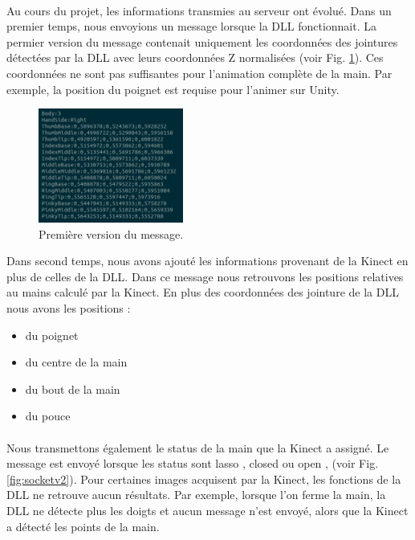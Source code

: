 \paragraph{}
Au cours du projet, les informations transmies au serveur ont évolué. 
Dans un premier temps, nous envoyions un message lorsque la DLL fonctionnait. 
La permier version du message contenait uniquement les coordonnées des 
jointures détectées par la DLL avec leurs coordonnées Z normalisées (voir Fig. \ref{fig:socketv1}).
Ces coordonnées ne sont pas suffisantes pour l'animation complète de la 
main. Par exemple, la position du poignet est requise pour l'animer 
sur Unity.

\begin{figure}[H]
  \label{fig:socketv1}
  \begin{center}
    \includegraphics[width=180px]{images/socket_v1.png}
    \caption{Première version du message.}
  \end{center}
\end{figure}

Dans second temps, nous avons ajouté les informations provenant de la 
Kinect en plus de celles de la DLL. Dans ce message nous retrouvons 
les positions relatives au mains calculé par la Kinect. En plus des 
coordonnées des jointure de la DLL nous avons les positions :\\
\begin{itemize}
  \item du poignet
  \item du centre de la main
  \item du bout de la main
  \item du pouce
\end{itemize}
\paragraph{}
Nous transmettons également le status de la main que la Kinect a 
assigné. Le message est envoyé lorsque les status sont \og lasso \fg, \og closed \fg ou 
\og open \fg, (voir Fig. \ref{fig:socketv2}). Pour certaines images 
acquisent par la Kinect, les fonctions de la DLL ne retrouve aucun 
résultats. Par exemple, lorsque l'on ferme la main, la DLL ne détecte 
plus les doigts et aucun message n'est envoyé, alors que la Kinect a 
détecté les points de la main.


